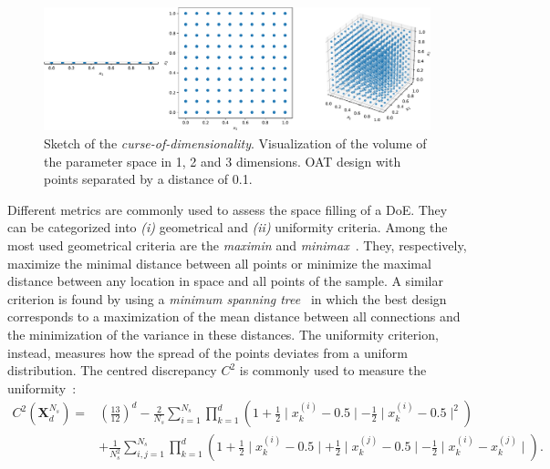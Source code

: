 \begin{figure}[!ht]
\centering
\includegraphics[width=\linewidth,keepaspectratio]{fig/literature/curse_dim.pdf}
\caption{Sketch of the \emph{curse-of-dimensionality}. Visualization of the volume of the parameter space in 1, 2 and 3 dimensions. OAT design with points separated by a distance of 0.1.}
\label{fig:curse_dim}
\end{figure}

Different metrics are commonly used to assess the space filling of a DoE. They can be categorized into \emph{(i)} geometrical and \emph{(ii)} uniformity criteria. Among the most used geometrical criteria are the \emph{maximin} and \emph{minimax}~\citep{Pronzato2017}. They, respectively, maximize the minimal distance between all points or minimize the maximal distance between any location in space and all points of the sample. A similar criterion is found by using a \emph{minimum spanning tree}~\citep{Franco2009} in which the best design corresponds to a maximization of the mean distance between all connections and the minimization of the variance in these distances. The uniformity criterion, instead, measures how the spread of the points deviates from a uniform distribution. The centred discrepancy $C^2$ is commonly used to measure the uniformity~\citep{Fang2006,Damblin2013}:
\begin{align}
C^2(\mathbf{X}^{N_s}_d) =& \left( \frac{13}{12} \right)^d - \frac{2}{N_s}\displaystyle\sum_{i=1}^{N_s}\prod_{k=1}^{d} \left( 1 + \frac{1}{2} \mid  x_k^{(i)} - 0.5\mid - \frac{1}{2} \mid  x_k^{(i)} - 0.5\mid^2\right)\\ \nonumber
& + \frac{1}{N_s^2}\sum_{i,j=1}^{N_s}\prod_{k=1}^d \left( 1 + \frac{1}{2} \mid  x_k^{(i)} - 0.5\mid + \frac{1}{2} \mid  x_k^{(j)} - 0.5\mid - \frac{1}{2} \mid  x_k^{(i)} - x_k^{(j)}\mid \right). \label{eq:c2}
\end{align}

